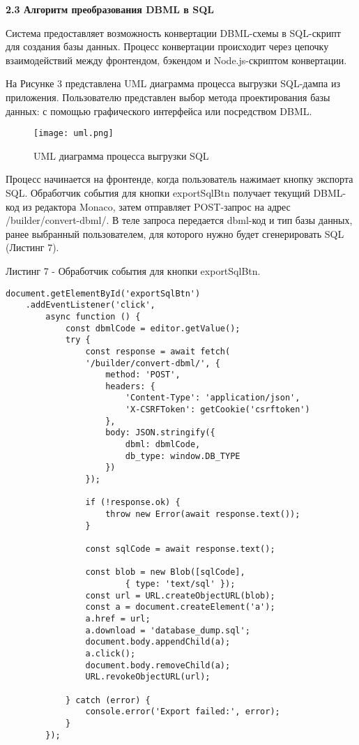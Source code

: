 \newpage
\textbf{2.3 Алгоритм преобразования DBML в SQL}

Система предоставляет возможность конвертации DBML-схемы в SQL-скрипт для создания базы данных. Процесс конвертации происходит через цепочку взаимодействий между фронтендом, бэкендом и Node.js-скриптом конвертации.

На Рисунке 3 представлена UML диаграмма процесса выгрузки SQL-дампа из приложения. Пользователю представлен выбор метода проектирования базы данных: с помощью графического интерфейса или посредством DBML.

\renewcommand{\figurename}{Рисунок}
\begin{figure}[htbp]
    \centering %
    \texttt{[image: uml.png]} 
    \caption{UML диаграмма процесса выгрузки SQL}
    \label{fig:analyze} %
\end{figure}

Процесс начинается на фронтенде, когда пользователь нажимает кнопку экспорта SQL. Обработчик события для кнопки exportSqlBtn получает текущий DBML-код из редактора Monaco, затем отправляет POST-запрос на адрес /builder/convert-dbml/. В теле запроса передается dbml-код и тип базы данных, ранее выбранный пользователем, для которого нужно будет сгенерировать SQL (Листинг 7).

\newpage
Листинг 7 - Обработчик события для кнопки exportSqlBtn.
\begin{lstlisting}[frame=single]
document.getElementById('exportSqlBtn')
    .addEventListener('click',
        async function () {
            const dbmlCode = editor.getValue();
            try {
                const response = await fetch(
                '/builder/convert-dbml/', {
                    method: 'POST',
                    headers: {
                        'Content-Type': 'application/json',
                        'X-CSRFToken': getCookie('csrftoken')
                    },
                    body: JSON.stringify({
                        dbml: dbmlCode,
                        db_type: window.DB_TYPE
                    })
                });

                if (!response.ok) {
                    throw new Error(await response.text());
                }

                const sqlCode = await response.text();

                const blob = new Blob([sqlCode], 
                        { type: 'text/sql' });
                const url = URL.createObjectURL(blob);
                const a = document.createElement('a');
                a.href = url;
                a.download = 'database_dump.sql';
                document.body.appendChild(a);
                a.click();
                document.body.removeChild(a);
                URL.revokeObjectURL(url);

            } catch (error) {
                console.error('Export failed:', error);
            }
        });
\end{lstlisting}

